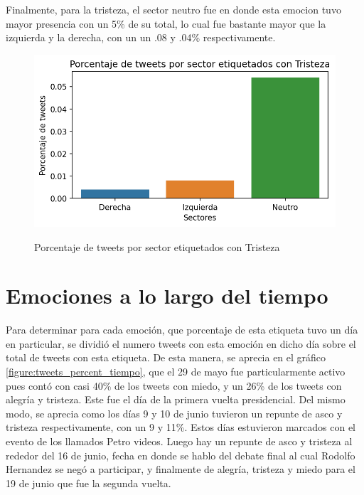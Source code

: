 Finalmente, para la tristeza, el sector neutro fue en donde esta emocion tuvo mayor presencia con un 5\% de su total, lo cual fue bastante mayor que la izquierda y la derecha, con un un .08 y .04\% respectivamente.

\begin{figure}[h]
	\caption{Porcentaje de tweets por sector etiquetados con Tristeza}
	\centering
	\includegraphics{../Images/Results/Porcentaje de tweets por sector etiquetados con Tristeza.png} 
	\label{figure:tweets_percent_tristeza}
\end{figure}




\section{Emociones a lo largo del tiempo}


Para determinar para cada emoción, que porcentaje de esta etiqueta tuvo un día en particular, se  dividió el numero tweets con esta emoción en dicho día sobre el total de tweets con esta etiqueta. De esta manera, se aprecia en el gráfico  \ref{figure:tweets_percent_tiempo}, que el 29 de mayo fue particularmente activo pues contó con casi 40\% de los tweets con miedo, y un 26\% de los tweets con alegría y tristeza. Este fue el día de la primera vuelta presidencial. Del mismo modo, se aprecia como los días 9 y 10 de junio tuvieron un repunte de asco y tristeza respectivamente, con un 9 y 11\%. Estos días estuvieron marcados con el evento de los llamados Petro videos. Luego hay un repunte de asco y tristeza al rededor del 16 de junio, fecha en donde se hablo del debate final al cual Rodolfo Hernandez se negó a participar, y finalmente de alegría, tristeza y miedo para el 19 de junio que fue la segunda vuelta.

